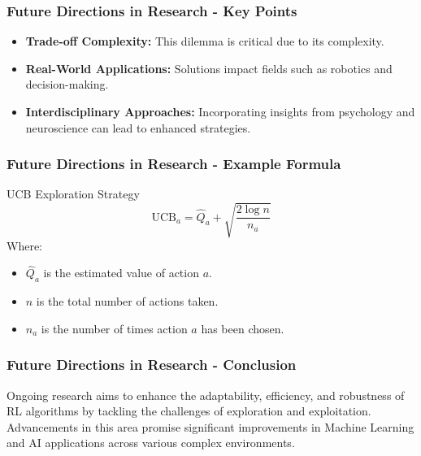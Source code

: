 \documentclass[aspectratio=169]{beamer}
\begin{document}
\begin{frame}[fragile]
    \frametitle{Future Directions in Research - Key Points}
    \begin{itemize}
        \item \textbf{Trade-off Complexity:} This dilemma is critical due to its complexity.
        \item \textbf{Real-World Applications:} Solutions impact fields such as robotics and decision-making.
        \item \textbf{Interdisciplinary Approaches:} Incorporating insights from psychology and neuroscience can lead to enhanced strategies.
    \end{itemize}
\end{frame}

\begin{frame}[fragile]
    \frametitle{Future Directions in Research - Example Formula}
    \begin{block}{UCB Exploration Strategy}
        \[
        \text{UCB}_a = \hat{Q}_a + \sqrt{\frac{2 \log n}{n_a}}
        \]
        Where:
        \begin{itemize}
            \item \( \hat{Q}_a \) is the estimated value of action \( a \).
            \item \( n \) is the total number of actions taken.
            \item \( n_a \) is the number of times action \( a \) has been chosen.
        \end{itemize}
    \end{block}
\end{frame}

\begin{frame}[fragile]
    \frametitle{Future Directions in Research - Conclusion}
    Ongoing research aims to enhance the adaptability, efficiency, and robustness of RL algorithms by tackling the challenges of exploration and exploitation. Advancements in this area promise significant improvements in Machine Learning and AI applications across various complex environments.
\end{frame}
\end{document}
